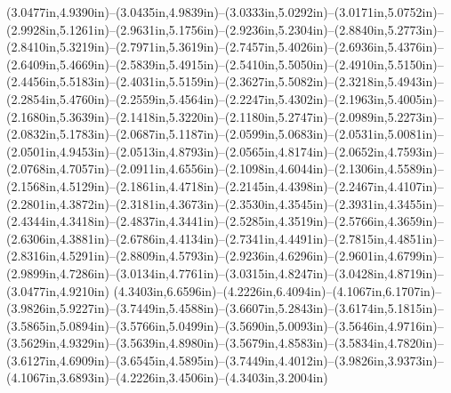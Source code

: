 (3.0477in,4.9390in)--(3.0435in,4.9839in)--(3.0333in,5.0292in)--(3.0171in,5.0752in)--(2.9928in,5.1261in)--(2.9631in,5.1756in)--(2.9236in,5.2304in)--(2.8840in,5.2773in)--(2.8410in,5.3219in)--(2.7971in,5.3619in)--(2.7457in,5.4026in)--(2.6936in,5.4376in)--(2.6409in,5.4669in)--(2.5839in,5.4915in)--(2.5410in,5.5050in)--(2.4910in,5.5150in)--(2.4456in,5.5183in)--(2.4031in,5.5159in)--(2.3627in,5.5082in)--(2.3218in,5.4943in)--(2.2854in,5.4760in)--(2.2559in,5.4564in)--(2.2247in,5.4302in)--(2.1963in,5.4005in)--(2.1680in,5.3639in)--(2.1418in,5.3220in)--(2.1180in,5.2747in)--(2.0989in,5.2273in)--(2.0832in,5.1783in)--(2.0687in,5.1187in)--(2.0599in,5.0683in)--(2.0531in,5.0081in)--(2.0501in,4.9453in)--(2.0513in,4.8793in)--(2.0565in,4.8174in)--(2.0652in,4.7593in)--(2.0768in,4.7057in)--(2.0911in,4.6556in)--(2.1098in,4.6044in)--(2.1306in,4.5589in)--(2.1568in,4.5129in)--(2.1861in,4.4718in)--(2.2145in,4.4398in)--(2.2467in,4.4107in)--(2.2801in,4.3872in)--(2.3181in,4.3673in)--(2.3530in,4.3545in)--(2.3931in,4.3455in)--(2.4344in,4.3418in)--(2.4837in,4.3441in)--(2.5285in,4.3519in)--(2.5766in,4.3659in)--(2.6306in,4.3881in)--(2.6786in,4.4134in)--(2.7341in,4.4491in)--(2.7815in,4.4851in)--(2.8316in,4.5291in)--(2.8809in,4.5793in)--(2.9236in,4.6296in)--(2.9601in,4.6799in)--(2.9899in,4.7286in)--(3.0134in,4.7761in)--(3.0315in,4.8247in)--(3.0428in,4.8719in)--(3.0477in,4.9210in) (4.3403in,6.6596in)--(4.2226in,6.4094in)--(4.1067in,6.1707in)--(3.9826in,5.9227in)--(3.7449in,5.4588in)--(3.6607in,5.2843in)--(3.6174in,5.1815in)--(3.5865in,5.0894in)--(3.5766in,5.0499in)--(3.5690in,5.0093in)--(3.5646in,4.9716in)--(3.5629in,4.9329in)--(3.5639in,4.8980in)--(3.5679in,4.8583in)--(3.5834in,4.7820in)--(3.6127in,4.6909in)--(3.6545in,4.5895in)--(3.7449in,4.4012in)--(3.9826in,3.9373in)--(4.1067in,3.6893in)--(4.2226in,3.4506in)--(4.3403in,3.2004in) 